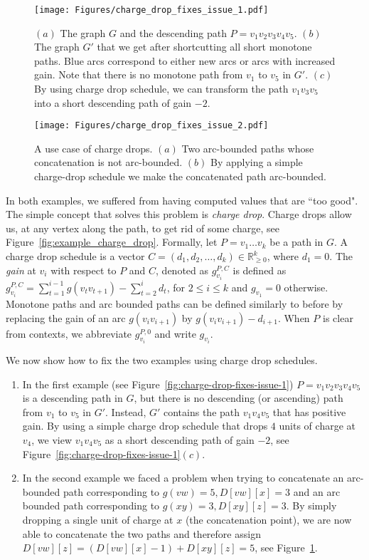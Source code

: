 \documentclass[11pt]{article}
\newcommand{\RR}{\mathbb{R}}
\begin{document}
\begin{figure}[t!]
    \centering
    \texttt{[image: Figures/charge\_drop\_fixes\_issue\_1.pdf]}
    \caption{$(a)$ The graph $G$ and the descending path $P=v_1 v_2 v_3 v_4 v_5$. 
    $(b)$ The graph $G'$ that we get after shortcutting all short monotone paths. Blue arcs correspond to either new arcs or arcs with increased gain. Note that there is no monotone path from $v_1$ to $v_5$ in $G'$. $(c)$ By using charge drop schedule, we can transform the path $v_1 v_3 v_5$ into a short descending path of gain $-2$.}
    \label{fig:charge-drop-fixes-issue-1}

    \texttt{[image: Figures/charge\_drop\_fixes\_issue\_2.pdf]}
    \caption{A use case of charge drops. $(a)$ Two arc-bounded paths whose concatenation is not arc-bounded. $(b)$ By applying a simple charge-drop schedule we make the concatenated path arc-bounded.}
    \label{fig:charge-drop-fixes-issue-2}
\end{figure}

In both examples, we suffered from having computed values that are ``too good". The simple concept that solves this problem is \emph{charge drop}. Charge drops allow us, at any vertex along the path, to get rid of some charge, see Figure~\ref{fig:example_charge_drop}. Formally, let $P = v_1\ldots v_k$ be a path in $G$. A charge drop schedule is a vector $C=(d_1,d_2,\ldots, d_k)\in \RR^k_{\ge 0}$, where $d_1 = 0$. The \emph{gain} at $v_i$ with respect to $P$ and $C$, denoted as $g^{P,C}_{v_i}$ is defined as $g_{v_i}^{P,C} =\sum_{t=1}^{i-1} g(v_{t} v_{t+1}) - \sum_{t=2}^{i} d_t$, for $2\le i\le k$ and $g_{v_1} = 0$ otherwise. Monotone paths and arc bounded paths can be defined similarly to before by replacing the gain of an arc $g(v_i v_{i+1})$ by $g(v_i v_{i+1}) - d_{i+1}$. When $P$ is clear from contexts, we abbreviate  $g^{P,0}_{v_i}$ and write $g_{v_i}$.

We now show how to fix the two examples using charge drop schedules.

\begin{enumerate}
    \item In the first example (see Figure~\ref{fig:charge-drop-fixes-issue-1}) $P= v_1 v_2 v_3 v_4 v_5$ is a descending path in $G$, but there is no descending (or ascending) path from $v_1$ to $v_5$ in $G'$.   Instead, $G'$ contains the path $v_1 v_4 v_5$ that has positive gain. By using a simple charge drop schedule that drops $4$ units of charge at $v_4$, 
    we view $v_1 v_4 v_5$ as a short descending path of gain $-2$, see Figure~\ref{fig:charge-drop-fixes-issue-1}$(c)$.


    \item In the second example we faced a problem when trying to concatenate an arc-bounded path corresponding to $g(vw)=5, D[vw][x]=3$ and an arc bounded path corresponding to $g(xy)=3, D[xy][z] = 3$. By simply dropping a single unit of charge at $x$ (the concatenation point), we are now able to concatenate the two paths and therefore assign $D[vw][z] = (D[vw][x] -1) +D[xy][z] = 5$, see Figure~\ref{fig:charge-drop-fixes-issue-2}.
\end{enumerate}
\end{document}
